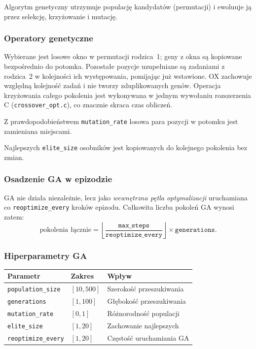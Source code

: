 \documentclass[11pt,a4paper]{article}
\begin{document}
Algorytm genetyczny utrzymuje populację kandydatów
(permutacji) i ewoluuje ją przez selekcję, krzyżowanie i mutację.

\subsubsection*{Operatory genetyczne}

\begin{description}[style=nextline]
  \item[\normalfont\textit{Krzyżowanie (Order Crossover, OX)}]
    Wybierane jest losowe okno w permutacji rodzica~1; geny z okna są
    kopiowane bezpośrednio do potomka.
    Pozostałe pozycje uzupełniane są zadaniami z rodzica~2 w kolejności ich
    występowania, pomijając już wstawione.
    OX zachowuje względną kolejność zadań i nie tworzy zduplikowanych genów.
    Operacja krzyżowania całego pokolenia jest wykonywana w jednym wywołaniu
    rozszerzenia C (\texttt{crossover\_opt.c}), co znacznie skraca czas
    obliczeń.

  \item[\normalfont\textit{Mutacja}]
    Z prawdopodobieństwem \texttt{mutation\_rate} losowa para pozycji
    w potomku jest zamieniana miejscami.

  \item[\normalfont\textit{Elityzm}]
    Najlepszych \texttt{elite\_size} osobników jest kopiowanych do kolejnego
    pokolenia bez zmian.
\end{description}

\subsubsection*{Osadzenie GA w epizodzie}

GA nie działa niezależnie, lecz jako \emph{wewnętrzna pętla optymalizacji}
uruchamiana co \texttt{reoptimize\_every} kroków epizodu.
Całkowita liczba pokoleń GA wynosi zatem:
\[
  \text{pokolenia łącznie} = \left\lfloor \frac{\texttt{max\_steps}}
  {\texttt{reoptimize\_every}} \right\rfloor \times \texttt{generations}.
\]

\subsubsection*{Hiperparametry GA}

\begin{center}
\begin{tabular}{@{}lll@{}}
\toprule
\textbf{Parametr} & \textbf{Zakres} & \textbf{Wpływ} \\
\midrule
\texttt{population\_size}   & $[10, 500]$  & Szerokość przeszukiwania \\
\texttt{generations}        & $[1, 100]$   & Głębokość przeszukiwania \\
\texttt{mutation\_rate}     & $[0, 1]$     & Różnorodność populacji \\
\texttt{elite\_size}        & $[1, 20]$    & Zachowanie najlepszych \\
\texttt{reoptimize\_every}  & $[1, 20]$    & Częstość uruchamiania GA \\
\bottomrule
\end{tabular}
\end{center}
\end{document}
